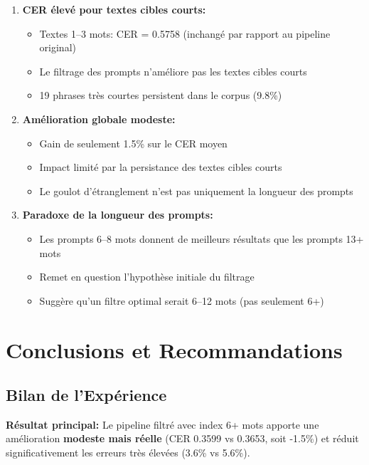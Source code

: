 \documentclass[12pt,a4paper]{article}
\begin{document}
\begin{enumerate}
    \item \textbf{CER élevé pour textes cibles courts:}
    \begin{itemize}
        \item Textes 1--3 mots: CER = 0.5758 (inchangé par rapport au pipeline original)
        \item Le filtrage des prompts n'améliore pas les textes cibles courts
        \item 19 phrases très courtes persistent dans le corpus (9.8\%)
    \end{itemize}
    
    \item \textbf{Amélioration globale modeste:}
    \begin{itemize}
        \item Gain de seulement 1.5\% sur le CER moyen
        \item Impact limité par la persistance des textes cibles courts
        \item Le goulot d'étranglement n'est pas uniquement la longueur des prompts
    \end{itemize}
    
    \item \textbf{Paradoxe de la longueur des prompts:}
    \begin{itemize}
        \item Les prompts 6--8 mots donnent de meilleurs résultats que les prompts 13+ mots
        \item Remet en question l'hypothèse initiale du filtrage
        \item Suggère qu'un filtre optimal serait 6--12 mots (pas seulement 6+)
    \end{itemize}
\end{enumerate}

\section{Conclusions et Recommandations}

\subsection{Bilan de l'Expérience}

\textbf{Résultat principal:} Le pipeline filtré avec index 6+ mots apporte une amélioration \textbf{modeste mais réelle} (CER 0.3599 vs 0.3653, soit -1.5\%) et réduit significativement les erreurs très élevées (3.6\% vs 5.6\%).
\end{document}
